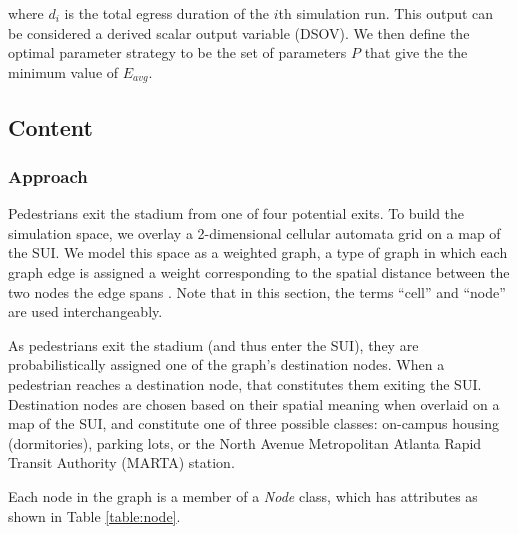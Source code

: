 \documentclass[12pt]{article}
\begin{document}
where $d_i$ is the total egress duration of the $i$th simulation run. This
output can be considered a derived scalar output variable (DSOV). We then
define the optimal parameter strategy to be the set of parameters $P$ that
give the the minimum value of $E_{avg}$.

\subsection{Content}

\subsubsection{Approach}
Pedestrians exit the stadium from one of four potential exits. To build the
simulation space, we overlay a 2-dimensional cellular automata grid on a map of
the SUI. We model this space as a weighted graph, a type of graph in which each
graph edge is assigned a weight corresponding to the spatial distance between the two nodes the edge spans \cite{west2001introduction}.  Note that in this section, the terms “cell” and “node” are used interchangeably.

As pedestrians exit the stadium (and thus enter the SUI), they are probabilistically assigned one of the graph’s destination nodes.  When a pedestrian reaches a destination node, that constitutes them exiting the SUI. Destination nodes are chosen based on their spatial meaning when overlaid on a map of the SUI, and constitute one of three possible classes: on-campus housing
(dormitories), parking lots, or the North Avenue Metropolitan Atlanta Rapid
Transit Authority (MARTA) station.

Each node in the graph is a member of a \textit{Node} class, which
has attributes as shown in Table \ref{table:node}.
\end{document}
